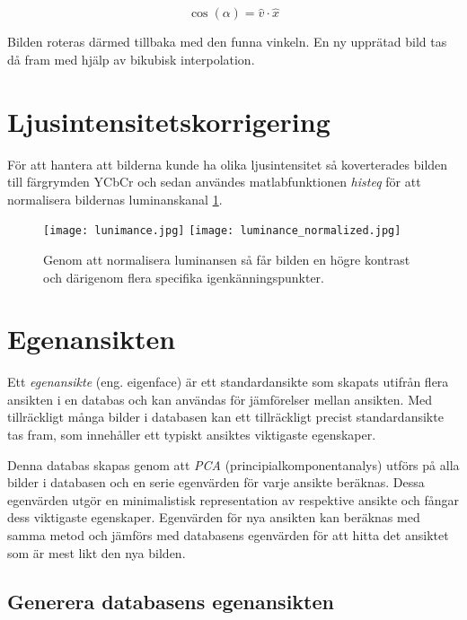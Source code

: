 \documentclass[a4paper,12pt,oneside,final]{extbook}
\begin{document}
\begin{equation} \label{angle}
\cos(\alpha) = \widehat{v} \cdot \widehat{x}
\end{equation}



Bilden roteras därmed tillbaka med den funna vinkeln. En ny upprätad bild tas då fram med hjälp av bikubisk interpolation. 

\section{Ljusintensitetskorrigering}

För att hantera att bilderna kunde ha olika ljusintensitet så koverterades bilden till färgrymden YCbCr och sedan användes matlabfunktionen \textit{histeq} för att normalisera bildernas luminanskanal \ref{fig:luminance}. 

\begin{figure}[!ht]
  \centering
   \texttt{[image: lunimance.jpg]} 
   \texttt{[image: luminance\_normalized.jpg]}  
   \caption{Genom att normalisera luminansen så får bilden en högre kontrast och därigenom flera specifika igenkänningspunkter.}
   \label{fig:luminance}
\end{figure}


\section{Egenansikten}

Ett \textit{egenansikte} (eng. eigenface) är ett standardansikte som skapats utifrån flera ansikten i en databas och kan användas för jämförelser mellan ansikten. Med tillräckligt många bilder i databasen kan ett tillräckligt precist standardansikte tas fram, som innehåller ett typiskt ansiktes viktigaste egenskaper.

Denna databas skapas genom att \textit{PCA} (principialkomponentanalys) utförs på alla bilder i databasen och en serie egenvärden för varje ansikte beräknas. Dessa egenvärden utgör en minimalistisk representation av respektive ansikte och fångar dess viktigaste egenskaper. Egenvärden för nya ansikten kan beräknas med samma metod och jämförs med databasens egenvärden för att hitta det ansiktet som är mest likt den nya bilden.

\subsection{Generera databasens egenansikten}
\end{document}
